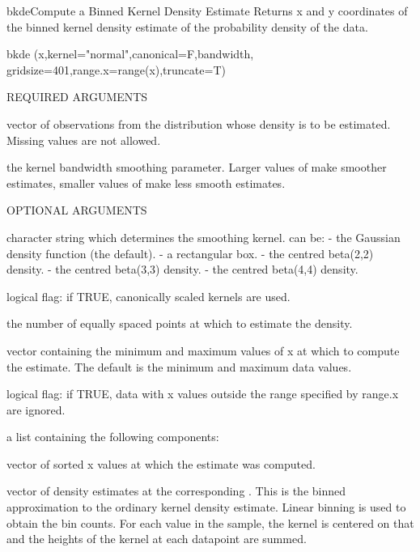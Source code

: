 \pagebreak
%  
\begin{Helpfile}{bkde}{Compute a Binned Kernel Density Estimate}
Returns x and y coordinates of the binned
kernel density estimate of the probability
density of the data.  
\begin{Example}
bkde (x,kernel="normal",canonical=F,bandwidth,
      gridsize=401,range.x=range(x),truncate=T)
\end{Example}
\begin{Argument}{REQUIRED ARGUMENTS}
\item[\Co{x:}]
vector of observations from the distribution whose density is to
be estimated.
Missing values are not allowed.
\item[\Co{bandwidth:}]
the kernel bandwidth smoothing parameter.
Larger values of  make smoother estimates,
smaller values of  make less smooth estimates.
\end{Argument}
\begin{Argument}{OPTIONAL ARGUMENTS}
\item[\Co{kernel:}]
character string which determines the smoothing kernel.
 can be:
 - the Gaussian density function (the default).
 - a rectangular box.
 - the centred beta(2,2) density.
 - the centred beta(3,3) density.
 - the centred beta(4,4) density.
\item[\Co{canonical:}]
logical flag: if TRUE, canonically scaled kernels are used.
\item[\Co{gridsize:}]
the number of equally spaced points at which to estimate
the density.
\item[\Co{range.x:}]
vector containing the minimum and maximum values of x
at which to compute the estimate.
The default is the minimum and maximum data values.
\item[\Co{truncate:}]
logical flag: if TRUE, data with x values outside the
range specified by range.x are ignored.
\end{Argument}
a list containing the following components:
\item[\Co{x:}]
vector of sorted x values at which the estimate was computed.
\item[\Co{y:}]
vector of density estimates
at the corresponding .
This is the binned approximation to the ordinary kernel density estimate.
Linear binning is used to obtain the bin counts.  
For each  value in the sample, the kernel is
centered on that  and the heights of the kernel at each datapoint are summed.

\end{Helpfile}
